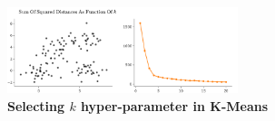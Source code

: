 \begin{figure}[!h]
	\centering
	\includegraphics[width=0.6\textwidth]{chapters/unsupervised.learning/figures/kmeans-selecting-k.png}
	\caption{\textbf{Selecting $k$ hyper-parameter in K-Means}}\label{selecting-k}
\end{figure}
